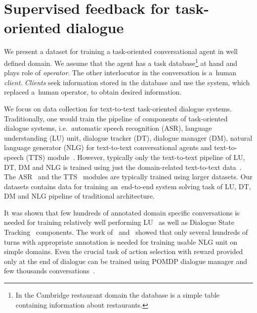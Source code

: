 \documentclass[runningheads,a4paper]{llncs}
\def\OD#1{{\color{darkgreen}OD: \it #1}}
\begin{document}

\section{Supervised feedback for task-oriented dialogue} \label{sec:repre}
\vspace{-0.50em}
We present a dataset for training a task-oriented conversational agent in well defined domain.
We assume that the agent has a task database\footnote{In the Cambridge restaurant domain the database is a simple table containing information about restaurants.} at hand and plays role of {\it operator}.
The other interlocutor in the conversation is a~human {\it client}.
{\it Clients} seek information stored in the database and use the system, which replaced a~human operator, to obtain desired information.

We focus on data collection for text-to-text task-oriented dialogue systems.
Traditionally, one would train the pipeline of components of task-oriented dialogue systems, i.e.\ automatic speech recognition (ASR), language understanding (LU) unit, dialogue tracker (DT), dialogue manager (DM), natural language generator (NLG) for text-to-text conversational agents and text-to-speech (TTS) module~\cite{duvsek2014alex}.
However, typically only the text-to-text pipeline of LU, DT, DM and NLG is trained using just the domain-related text-to-text data~\cite{gasic2011line,jurvcivcek2014factored,duvsek2016sequence}.
The ASR~\cite{platek2014free} and the TTS~\cite{taylor2009text} modules are typically trained using larger datasets.
Our datasets contains data for training an~end-to-end system solving task of LU, DT, DM and NLG pipeline of traditional architecture.

It was shown that few hundreds of annotated domain specific conversations is needed for training relatively well performing LU~\cite{jurvcivcek2014factored} as well as Dialogue State Tracking~\cite{young2010hidden} components.
The work of~\cite{duvsek2016sequence} and~\cite{mairesse2010phrase} showed that only several hundreds of turns with appropriate annotation is needed for training usable NLG unit on simple domains.
Even the crucial task of action selection with reward provided only at the end of dialogue can be trained using POMDP dialogue manager and few thousands conversations~\cite{gasic2011line}.
\end{document}
